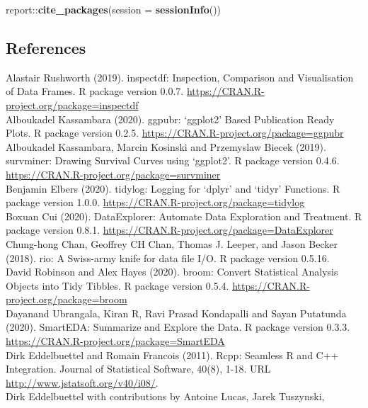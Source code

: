 \documentclass[
]{article}
\newenvironment{Shaded}{\begin{snugshade}}{\end{snugshade}}
\newcommand{\DataTypeTok}[1]{\textcolor[rgb]{0.00,0.34,0.68}{#1}}
\newcommand{\KeywordTok}[1]{\textcolor[rgb]{0.12,0.11,0.11}{\textbf{#1}}}
\newcommand{\NormalTok}[1]{\textcolor[rgb]{0.12,0.11,0.11}{#1}}
\newcommand{\OperatorTok}[1]{\textcolor[rgb]{0.12,0.11,0.11}{#1}}
\begin{document}
\begin{Shaded}
\begin{Highlighting}[]
\NormalTok{report}\OperatorTok{::}\KeywordTok{cite_packages}\NormalTok{(}\DataTypeTok{session =} \KeywordTok{sessionInfo}\NormalTok{())}
\end{Highlighting}
\end{Shaded}

\hypertarget{references}{%
\subsection{References}\label{references}}

Alastair Rushworth (2019). inspectdf: Inspection, Comparison and
Visualisation of Data Frames. R package version 0.0.7.
\url{https://CRAN.R-project.org/package=inspectdf}\\
Alboukadel Kassambara (2020). ggpubr: `ggplot2' Based Publication Ready
Plots. R package version 0.2.5.
\url{https://CRAN.R-project.org/package=ggpubr}\\
Alboukadel Kassambara, Marcin Kosinski and Przemyslaw Biecek (2019).
survminer: Drawing Survival Curves using `ggplot2'. R package version
0.4.6. \url{https://CRAN.R-project.org/package=survminer}\\
Benjamin Elbers (2020). tidylog: Logging for `dplyr' and `tidyr'
Functions. R package version 1.0.0.
\url{https://CRAN.R-project.org/package=tidylog}\\
Boxuan Cui (2020). DataExplorer: Automate Data Exploration and
Treatment. R package version 0.8.1.
\url{https://CRAN.R-project.org/package=DataExplorer}\\
Chung-hong Chan, Geoffrey CH Chan, Thomas J. Leeper, and Jason Becker
(2018). rio: A Swiss-army knife for data file I/O. R package version
0.5.16.\\
David Robinson and Alex Hayes (2020). broom: Convert Statistical
Analysis Objects into Tidy Tibbles. R package version 0.5.4.
\url{https://CRAN.R-project.org/package=broom}\\
Dayanand Ubrangala, Kiran R, Ravi Prasad Kondapalli and Sayan Putatunda
(2020). SmartEDA: Summarize and Explore the Data. R package version
0.3.3. \url{https://CRAN.R-project.org/package=SmartEDA}\\
Dirk Eddelbuettel and Romain Francois (2011). Rcpp: Seamless R and C++
Integration. Journal of Statistical Software, 40(8), 1-18. URL
\url{http://www.jstatsoft.org/v40/i08/}.\\
Dirk Eddelbuettel with contributions by Antoine Lucas, Jarek Tuszynski,
\end{document}
